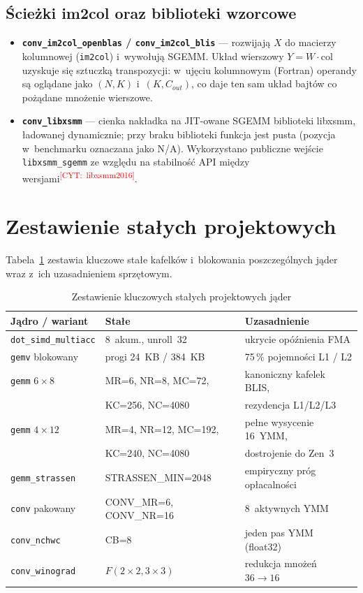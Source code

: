 \documentclass[a4paper,12pt]{book} %
\newcommand{\todocite}[1]{\textsuperscript{\textcolor{red}{[CYT:~#1]}}}
\newcommand{\kod}[1]{\texttt{#1}}
\begin{document}
\subsection{Ścieżki im2col oraz biblioteki wzorcowe}
\begin{itemize}
\item \textbf{\kod{conv\_im2col\_openblas} / \kod{conv\_im2col\_blis}} ---
  rozwijają $X$ do macierzy kolumnowej (\kod{im2col}) i~wywołują SGEMM. Układ
  wierszowy $Y=W\cdot\mathrm{col}$ uzyskuje się sztuczką transpozycji: w~ujęciu
  kolumnowym (Fortran) operandy są oglądane jako $(N,K)$ i~$(K,C_{out})$, co daje
  ten sam układ bajtów co pożądane mnożenie wierszowe.
\item \textbf{\kod{conv\_libxsmm}} --- cienka nakładka na JIT-owane SGEMM
  biblioteki libxsmm, ładowanej dynamicznie; przy braku biblioteki funkcja jest
  pusta (pozycja w~benchmarku oznaczana jako N/A). Wykorzystano publiczne wejście
  \kod{libxsmm\_sgemm} ze względu na stabilność API między wersjami\todocite{libxsmm2016}.
\end{itemize}

\section{Zestawienie stałych projektowych}
\label{sec:stale}

Tabela~\ref{tab:stale} zestawia kluczowe stałe kafelków i~blokowania
poszczególnych jąder wraz z~ich uzasadnieniem sprzętowym.

\begin{table}[t!]
\begin{center}
\caption{Zestawienie kluczowych stałych projektowych jąder}\label{tab:stale}
\begin{tabular}{l|l|l}
Jądro / wariant & Stałe & Uzasadnienie \\
\hline
\kod{dot\_simd\_multiacc} & 8~akum., unroll~32 & ukrycie opóźnienia FMA \\
\kod{gemv} blokowany & progi 24~KB / 384~KB & 75\,\% pojemności L1 / L2 \\
\kod{gemm} $6\times8$ & MR=6, NR=8, MC=72, & kanoniczny kafelek BLIS, \\
                      & KC=256, NC=4080      & rezydencja L1/L2/L3 \\
\kod{gemm} $4\times12$ & MR=4, NR=12, MC=192, & pełne wysycenie 16~YMM, \\
                       & KC=240, NC=4080      & dostrojenie do Zen~3 \\
\kod{gemm\_strassen} & STRASSEN\_MIN=2048 & empiryczny próg opłacalności \\
\kod{conv} pakowany & CONV\_MR=6, CONV\_NR=16 & 8~aktywnych YMM \\
\kod{conv\_nchwc} & CB=8 & jeden pas YMM (float32) \\
\kod{conv\_winograd} & $F(2\times2,3\times3)$ & redukcja mnożeń $36\to16$ \\
\end{tabular}
\end{center}
\end{table}
\end{document}
